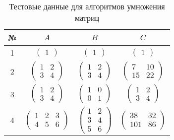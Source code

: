 \begin{table}[H]
  \caption{\label{table:tests} Тестовые данные для алгоритмов умножения матриц}
  \begin{center}
    \begin{tabular}{|c|c|c|c|}
      \hline
      № & $A$ & $B$ & $C$ \\ \hline
      1 & 
      $\begin{pmatrix}
	  1
	  \end{pmatrix}$
      &
      $\begin{pmatrix}
	  1
	  \end{pmatrix}$
      &
      $\begin{pmatrix}
	  1
	  \end{pmatrix}$
      \\ \hline
      
      
      2 &
      $\begin{pmatrix}
	  1 & 2 \\ 3 & 4
	  \end{pmatrix}$
      &
      $\begin{pmatrix}
	  1 & 2 \\ 3 & 4
	  \end{pmatrix}$
      &
      $\begin{pmatrix}
	  7 & 10 \\ 15 & 22
	  \end{pmatrix}$
      \\ \hline
      
      3 &
      $\begin{pmatrix}
	  1 & 2 \\ 3 & 4
	  \end{pmatrix}$
      &
      $\begin{pmatrix}
	  1 & 0 \\ 0 & 1
	  \end{pmatrix}$
      &
      $\begin{pmatrix}
	  1 & 2 \\ 3 & 4
	  \end{pmatrix}$
      \\ \hline
      
      4 &
      $\begin{pmatrix}
	  1 & 2 & 3 \\ 4 & 5 & 6
	  \end{pmatrix}$
      &
      $\begin{pmatrix}
	  1 & 2 \\ 3 & 4 \\ 5 & 6
	  \end{pmatrix}$
      &
      $\begin{pmatrix}
	  38 & 32 \\ 101 & 86
	  \end{pmatrix}$
      \\ \hline
      

\end{tabular}
\end{center}
\end{table}
